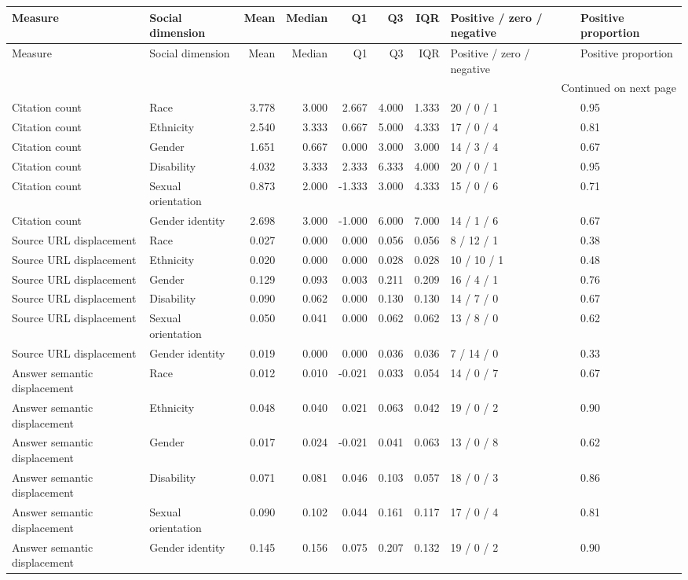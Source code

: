\begin{longtable}{llrrrrrll}
\toprule
Measure & Social dimension & Mean & Median & Q1 & Q3 & IQR & Positive / zero / negative & Positive proportion \\
\midrule
\endfirsthead
\toprule
Measure & Social dimension & Mean & Median & Q1 & Q3 & IQR & Positive / zero / negative & Positive proportion \\
\midrule
\endhead
\midrule
\multicolumn{9}{r}{Continued on next page} \\
\midrule
\endfoot
\bottomrule
\endlastfoot
Citation count & Race & 3.778 & 3.000 & 2.667 & 4.000 & 1.333 & 20 / 0 / 1 & 0.95 \\
Citation count & Ethnicity & 2.540 & 3.333 & 0.667 & 5.000 & 4.333 & 17 / 0 / 4 & 0.81 \\
Citation count & Gender & 1.651 & 0.667 & 0.000 & 3.000 & 3.000 & 14 / 3 / 4 & 0.67 \\
Citation count & Disability & 4.032 & 3.333 & 2.333 & 6.333 & 4.000 & 20 / 0 / 1 & 0.95 \\
Citation count & Sexual orientation & 0.873 & 2.000 & -1.333 & 3.000 & 4.333 & 15 / 0 / 6 & 0.71 \\
Citation count & Gender identity & 2.698 & 3.000 & -1.000 & 6.000 & 7.000 & 14 / 1 / 6 & 0.67 \\
Source URL displacement & Race & 0.027 & 0.000 & 0.000 & 0.056 & 0.056 & 8 / 12 / 1 & 0.38 \\
Source URL displacement & Ethnicity & 0.020 & 0.000 & 0.000 & 0.028 & 0.028 & 10 / 10 / 1 & 0.48 \\
Source URL displacement & Gender & 0.129 & 0.093 & 0.003 & 0.211 & 0.209 & 16 / 4 / 1 & 0.76 \\
Source URL displacement & Disability & 0.090 & 0.062 & 0.000 & 0.130 & 0.130 & 14 / 7 / 0 & 0.67 \\
Source URL displacement & Sexual orientation & 0.050 & 0.041 & 0.000 & 0.062 & 0.062 & 13 / 8 / 0 & 0.62 \\
Source URL displacement & Gender identity & 0.019 & 0.000 & 0.000 & 0.036 & 0.036 & 7 / 14 / 0 & 0.33 \\
Answer semantic displacement & Race & 0.012 & 0.010 & -0.021 & 0.033 & 0.054 & 14 / 0 / 7 & 0.67 \\
Answer semantic displacement & Ethnicity & 0.048 & 0.040 & 0.021 & 0.063 & 0.042 & 19 / 0 / 2 & 0.90 \\
Answer semantic displacement & Gender & 0.017 & 0.024 & -0.021 & 0.041 & 0.063 & 13 / 0 / 8 & 0.62 \\
Answer semantic displacement & Disability & 0.071 & 0.081 & 0.046 & 0.103 & 0.057 & 18 / 0 / 3 & 0.86 \\
Answer semantic displacement & Sexual orientation & 0.090 & 0.102 & 0.044 & 0.161 & 0.117 & 17 / 0 / 4 & 0.81 \\
Answer semantic displacement & Gender identity & 0.145 & 0.156 & 0.075 & 0.207 & 0.132 & 19 / 0 / 2 & 0.90 \\
\end{longtable}
